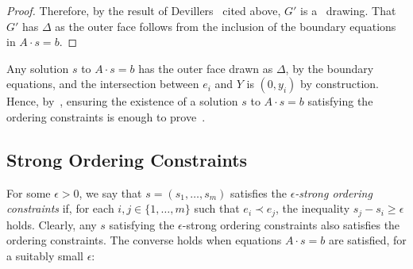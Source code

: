\begin{proof}
		
		
	Therefore, by the result of Devillers \etal\ cited above, $G'$
	is a \Fary\ drawing. That $G'$ has $\Delta$ as the outer
	face follows from the inclusion of the boundary equations in
	$A\cdot s = b$.
\end{proof}

Any solution $s$ to $A\cdot s=b$ has the outer face drawn as $\Delta$,
by the boundary equations, and the intersection between $e_i$ and $Y$ is $(0,y_i)$ by construction. Hence, by~, ensuring the existence of a solution $s$ to $A\cdot s=b$ satisfying the ordering constraints is enough to prove~.

\subsection{Strong Ordering Constraints}
\label{strong}

For some $\epsilon > 0$, we say that $s=(s_1,\ldots,s_m)$ satisfies
the \emph{$\epsilon$-strong ordering constraints} if, for each
$i,j\in\{1,\ldots,m\}$ such that $e_i\prec e_j$, the inequality
$s_j-s_i \ge \epsilon$ holds.
Clearly, any $s$ satisfying the $\epsilon$-strong ordering constraints
also satisfies the ordering constraints. The converse holds when
equations
$A\cdot s=b$
are satisfied, for a suitably small $\epsilon$:

